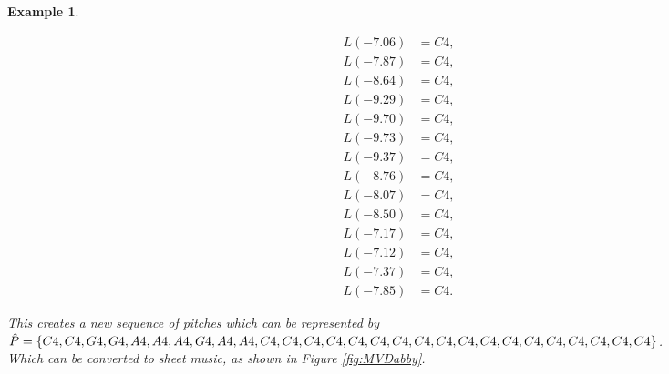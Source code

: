 \documentclass[11pt]{article}
\newtheorem{example}{Example}
\begin{document}
\begin{example}
\begin{multicols}{2}
\begin{align*}
L(-7.06) &= C4, \\
L(-7.87) &= C4, \\
L(-8.64) &= C4, \\
L(-9.29) &= C4, \\
L(-9.70) &= C4, \\
L(-9.73) &= C4, \\
L(-9.37) &= C4, \\
L(-8.76) &= C4, \\
L(-8.07) &= C4, \\
L(-8.50) &= C4, \\
L(-7.17) &= C4, \\
L(-7.12) &= C4, \\
L(-7.37) &= C4, \\
L(-7.85) &= C4.
\end{align*}

\end{multicols}
This creates a new sequence of pitches which can be represented by $\hat{P} = \{ C4, C4, G4, G4, A4, \\ A4, A4, G4, A4, A4, C4, C4, C4, C4, C4, C4, C4, C4, C4, C4, C4, C4, C4, C4, C4, C4, C4, C4 \}$. \\ Which can be converted to sheet music, as shown in Figure \ref{fig:MVDabby}. 

\end{example}
\end{document}
